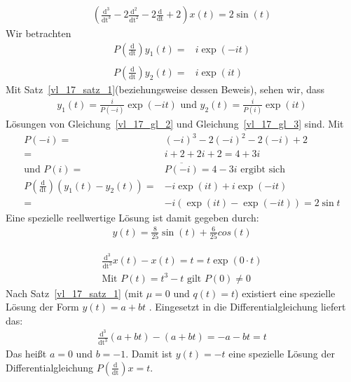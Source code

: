 \begin{Beispiel}{
	\begin{align*}
		\left(\frac{\mathrm{d^3}}{\mathrm{dt^3}} - 2 \frac{\mathrm{d^2}}
			{\mathrm{dt^2}} - 2 \frac{\mathrm{d}}{\mathrm{dt}} + 2\right) 
			x(t) = 2 \sin(t)
	\end{align*}
	Wir betrachten 
	\begin{align}
		P \left( \frac{\mathrm{d}}{\mathrm{dt}}\right)y_1(t) =& i\exp(-it) \\
			\label{vl_17_gl_2} \\
		P \left( \frac{\mathrm{d}}{\mathrm{dt}} \right) y_2(t) = & i \exp(it)
			\label{vl_17_gl_3}
	\end{align}
	Mit Satz~\ref{vl_17_satz_1}(beziehungsweise dessen Beweis),  sehen wir, dass 
	\begin{align*}
		y_1(t) = \frac{i}{P(-i)} \exp(-it) \text{ und }y_2(t) = \frac{i}{P(i)}
			\exp(it)
	\end{align*}
	Lösungen von Gleichung~\ref{vl_17_gl_2} und Gleichung~\ref{vl_17_gl_3} sind.
	Mit 
	\begin{align*}
		P(-i) = & (-i)^3 -2(-i)^2-2(-i)+2 \\ = & i + 2 + 2i + 2 = 4 +3i \\
		\text{und } P(i) = & \overline{P(-i)} = 4 -3i \text{ ergibt sich} \\
		P\left(\frac{\mathrm{d}}{\mathrm{dt}}\right)\left( y_1(t) - y_2(t)\right)
		= & -i \exp(it) + i \exp(-it)  \\
		= & -i (\exp(it) - \exp (-it)) = 2 \sin t
	\end{align*}
	Eine spezielle reellwertige Lösung ist damit gegeben durch:
	\begin{align*}
		y(t) = \frac{8}{25} \sin(t) + \frac{6}{25 }cos(t)
	\end{align*}
}\end{Beispiel}

\begin{Beispiel}{
	\begin{align*}
		\frac{\mathrm{d^3}}{\mathrm{dt^3}} x(t) - x(t) = t = t \exp(0 \cdot t) \\
		\text{Mit } P(t) = t^3 -t \text{ gilt } P(0) \neq 0
	\end{align*}
	Nach Satz~\ref{vl_17_satz_1} (mit $\mu=0$ und $q(t)=t$) existiert eine spezielle Lösung der Form $y(t) = a + bt$ 
	. Eingesetzt in die Differentialgleichung liefert das: 
	\begin{align*}
		\frac{\mathrm{d^3}}{\mathrm{dt^3}}(a+bt) - (a +bt) = - a -bt = t
	\end{align*}
	Das heißt $a = 0$ und $b = -1$. Damit ist $y(t) = -t$ eine spezielle Lösung 
	der Differentialgleichung $P \left( \frac{\mathrm{d}}{\mathrm{dt}}\right) 
	x = t$.
}\end{Beispiel}

